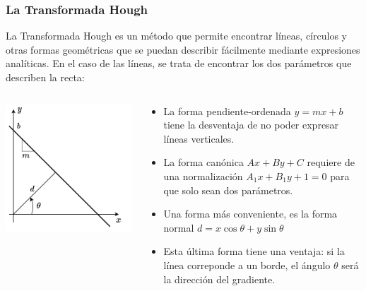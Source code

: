 \begin{frame}\frametitle{La Transformada Hough}
  La Transformada Hough es un método que permite encontrar líneas, círculos y otras formas geométricas que se puedan describir fácilmente mediante expresiones analíticas. En el caso de las líneas, se trata de encontrar los dos parámetros que describen la recta:
  \begin{columns}
    \begin{column}{0.4\textwidth}
      \includegraphics[width=\textwidth]{Figuras/Hough2.pdf}
    \end{column}
    \begin{column}{0.6\textwidth}
      \begin{itemize}
      \item La forma pendiente-ordenada $y = mx + b$ tiene la desventaja de no poder expresar líneas verticales.
      \item La forma canónica $Ax + By + C$ requiere de una normalización $A_1 x + B_1 y + 1 = 0$ para que solo sean dos parámetros.
      \item Una forma más conveniente, es la forma normal $d = x\cos\theta + y\sin\theta$
      \item Esta última forma tiene una ventaja: si la línea correponde a un borde, el ángulo $\theta$ será la dirección del gradiente. 
      \end{itemize}
    \end{column}
  \end{columns}
\end{frame}

